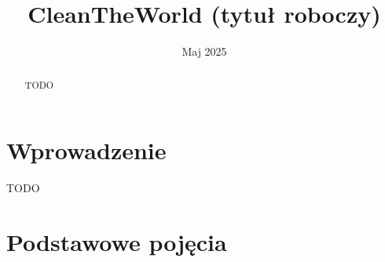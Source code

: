 \documentclass[licencjacka]{pracamgr}
\title{CleanTheWorld (tytuł roboczy)}
\date{Maj 2025}
\begin{document}
\maketitle

\begin{abstract}
TODO
\end{abstract}

\tableofcontents

\chapter*{Wprowadzenie}

% 
% 
TODO

\chapter{Podstawowe pojęcia}\label{r:pojecia}
\end{document}
